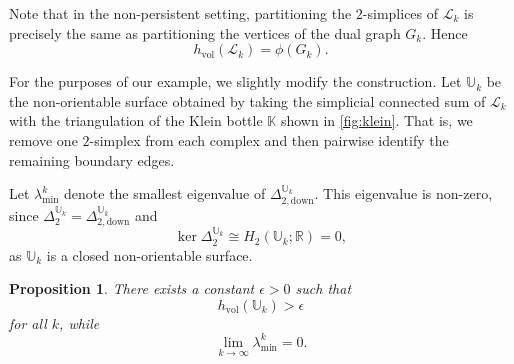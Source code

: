 \documentclass{article}
\newtheorem{proposition}{Proposition}[section]
\newcommand{\LL}{\mathcal{L}}
\begin{document}
Note that in the non-persistent setting, partitioning the \(2\)-simplices of \(\LL_k\)
is precisely the same as partitioning the vertices of the dual graph
\(G_k\). Hence
\[
    h_{\mathrm{vol}}(\LL_k)=\phi(G_k).
\]

For the purposes of our example, we slightly modify the construction.
Let \(\mathbb U_k\) be the non-orientable surface obtained by taking the
simplicial connected sum of \(\LL_k\) with the triangulation of the
Klein bottle \(\mathbb K\) shown in \cref{fig:klein}. That is, we remove
one \(2\)-simplex from each complex and then pairwise identify the
remaining boundary edges.

Let \(\lambda_{\min}^k\) denote the smallest eigenvalue of \(\Delta_{2,\mathrm{down}}^{\mathbb{U}_k}\).
This eigenvalue is non-zero, since $\Delta_{2}^{\mathbb{U}_k}=\Delta_{2,\mathrm{down}}^{\mathbb{U}_k}$ and 
\[
   \ker \Delta_{2}^{\mathbb{U}_k} \cong H_2(\mathbb U_k;\mathbb R)=0,
\]
as \(\mathbb U_k\) is a closed non-orientable surface.

\begin{proposition}
There exists a constant \(\epsilon>0\) such that
\[
    h_{\mathrm{vol}}(\mathbb U_k)>\epsilon
\]
for all \(k\), while
\[
    \lim_{k\to\infty}\lambda_{\min}^k=0.
\]
\end{proposition}
\end{document}
